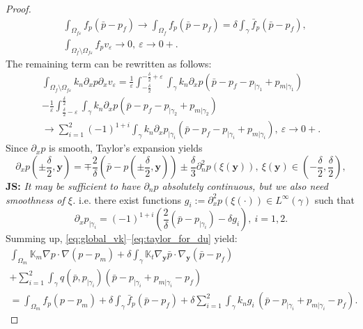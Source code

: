 \documentclass[a4paper]{article}
\def\vc#1{\mathbf{\boldsymbol{#1}}}     %
\def\tn#1{{\mathbb{#1}}}    %
\def\ep{\varepsilon}
\def\yy{{\vc y}}
\newcommand{\note}[2]{{\color{blue} \textbf{ #1:} \textit{#2}}}
\begin{document}
\begin{proof}
\begin{align}
&\int_{\Omega_{f\ep}} f_p (\bar p-p_f) \to \int_{\Omega_{f}} f_p (\bar p-p_f) = \delta\int_{\gamma} \bar f_p (\bar p-p_f), \\
&\int_{\Omega_f\setminus\Omega_{f\ep}} f_p v_\ep \to 0,~\ep\to 0+.
\end{align}
The remaining term can be rewritten as follows:
\begin{multline}
\int_{\Omega_f\setminus\Omega_{f\ep}} k_n\partial_x p \partial_x v_\ep
= \frac1\ep\int_{-\frac\delta2}^{-\frac\delta2+\ep}\int_\gamma k_n\partial_x p (\bar p - p_f - p_{|\gamma_1} + p_{m|\gamma_1})\\
- \frac1\ep\int_{\frac\delta2-\ep}^{\frac\delta2}\int_\gamma k_n\partial_x p (\bar p - p_f - p_{|\gamma_2} + p_{m|\gamma_2})\\
\to \sum_{i=1}^2(-1)^{1+i}\int_\gamma k_n \partial_x p_{|\gamma_i} (\bar p - p_f - p_{|\gamma_i} + p_{m|\gamma_i}),~\ep\to 0+.
\end{multline}
Since $\partial_x p$ is smooth, Taylor's expansion yields
\[ \partial_x p(\pm\frac\delta2,\vc y) = \mp\frac2\delta(\bar p - p(\pm\frac\delta2,\vc y)) \pm \frac\delta3\partial_n^2 p(\xi(\vc y)),~\xi(\yy)\in(-\frac\delta2,\frac\delta2), \]
\note{JS}{It may be sufficient to have $\partial_n p$ absolutely continuous, but we also need smoothness of $\xi$.}
i.e. there exist functions $g_i:=\partial^2_x p(\xi(\cdot))\in L^\infty(\gamma)$ such that
\begin{equation}
\label{eq:taylor_for_du}
\partial_x p_{|\gamma_i} = (-1)^{1+i}\left(\frac2\delta(\bar p - p_{|\gamma_i}) - \delta g_i\right),~i=1,2.
\end{equation}
Summing up, \eqref{eq:global_vk}--\eqref{eq:taylor_for_du} yield:
\begin{multline}
\label{eq:sum_global_vk_limit}
\int_{\Omega_m}\tn K_m\nabla p\cdot\nabla(p-p_m)
+\delta\int_\gamma\tn K_t\nabla_\yy\bar p\cdot\nabla_\yy(\bar p-p_f)\\
+ \sum_{i=1}^2\int_\gamma q(\bar p,p_{|\gamma_i}) (\bar p - p_{|\gamma_i} + p_{m|\gamma_i} - p_f)\\
= \int_{\Omega_m} f_p (p-p_m)
+ \delta\int_{\gamma} \bar f_p (\bar p-p_f)
+ \delta\sum_{i=1}^2\int_\gamma k_n g_i\, (\bar p - p_{|\gamma_i} + p_{m|\gamma_i} - p_f).
\end{multline}


\end{proof}
\end{document}
